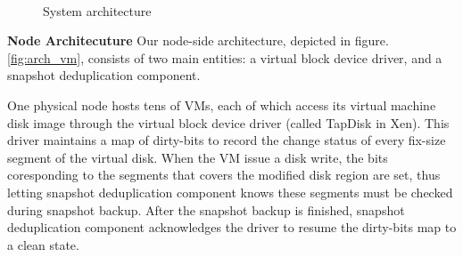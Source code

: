 \begin{figure}
    \centering
    \\
    \caption{System architecture}
    \label{fig:arch}
\end{figure}

{\bf Node Architecuture} 
Our node-side architecture, depicted in figure.\ref{fig:arch_vm}, consists of
two main entities: a virtual block device driver, and a snapshot deduplication component.

One physical node hosts tens of VMs, each of which access its virtual machine disk image through the
virtual block device driver (called TapDisk\cite{Warfield2005} in Xen).
This driver maintains a map of dirty-bits to record
the change status of every fix-size segment of the virtual disk. 
When the VM issue a disk write, the bits coresponding to the segments that covers 
the modified disk region are set, thus letting snapshot deduplication component knows these
segments must be checked during snapshot backup. After the snapshot backup is finished, 
snapshot deduplication component acknowledges the driver to resume the dirty-bits map to
a clean state.


